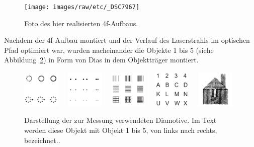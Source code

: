 \begin{figure}
\centering
\texttt{[image: images/raw/etc/\_DSC7967]}
\caption{Foto des hier realisierten 4f-Aufbaus.}
\label{fig:_DSC7967}
\end{figure}



Nachdem der 4f-Aufbau montiert und der Verlauf des Laserstrahls im optischen Pfad optimiert war, wurden nacheinander die Objekte 1 bis 5 (siehe Abbildung~\ref{fig:Objekte-aus-Anleitungsheft}) in Form von Dias in dem Objektträger montiert.

\begin{figure}
	\centering
	\includegraphics[width=0.16\textwidth]{images/Anleitungsheft/objekt1.png}~~
	\includegraphics[width=0.16\textwidth]{images/Anleitungsheft/objekt2.png}~~
	\includegraphics[width=0.16\textwidth]{images/Anleitungsheft/objekt3.png}~~
	\includegraphics[width=0.16\textwidth]{images/Anleitungsheft/objekt4.png}~~
	\includegraphics[width=0.16\textwidth]{images/Anleitungsheft/objekt5.png}
	\caption[Die zur Messung verwendeten Diamotive]{
		Darstellung der zur Messung verwendeten Diamotive. Im Text werden diese Objekt mit Objekt 1 bis 5, von links nach rechts, bezeichnet..
	}
\label{fig:Objekte-aus-Anleitungsheft}
\end{figure}

